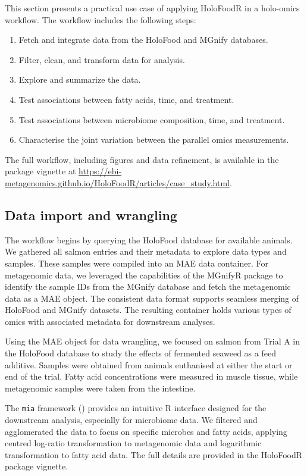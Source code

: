 \documentclass[unnumsec,webpdf,namedate,modern,large]{oup-authoring-template}%
\begin{document}
This section presents a practical use case of applying HoloFoodR in a holo-omics workflow.
The workflow includes the following steps:

\begin{enumerate}
    \item Fetch and integrate data from the HoloFood and MGnify databases.
    \item Filter, clean, and transform data for analysis.
    \item Explore and summarize the data.
    \item Test associations between fatty acids, time, and treatment.
    \item Test associations between microbiome composition, time, and treatment.
    \item Characterise the joint variation between the parallel omics measurements.
\end{enumerate}

The full workflow, including figures and data refinement, is available in the package vignette at \url{https://ebi-metagenomics.github.io/HoloFoodR/articles/case_study.html}.

\vspace{-1em}
\subsection{Data import and wrangling}

The workflow begins by querying the HoloFood database for available animals. We gathered all salmon entries and their metadata to explore data types and samples. These samples were compiled into an MAE data container. For metagenomic data, we leveraged the capabilities of the MGnifyR package to identify the sample IDs from the MGnify database and fetch the metagenomic data as a MAE object. The consistent data format supports  seamless merging of HoloFood and MGnify datasets. The resulting container holds various types of omics with associated metadata for downstream analyses.

Using the MAE object for data wrangling, we focused on salmon from Trial A in the HoloFood database to study the effects of fermented seaweed as a feed additive. Samples were obtained from animals euthanised at either the start or end of the trial. Fatty acid concentrations were measured in muscle tissue, while metagenomic samples were taken from the intestine.

The \texttt{mia} framework (\cite{oma}) provides an intuitive R interface designed for the downstream analysis, especially for microbiome data. We filtered and agglomerated the data to focus on specific microbes and fatty acids, applying centred log-ratio transformation to metagenomic data and logarithmic transformation to fatty acid data. The full details are provided in the HoloFoodR package vignette.
\end{document}
